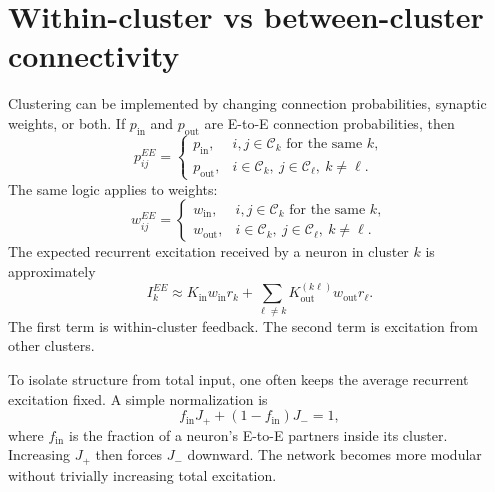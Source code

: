 \section{Within-cluster vs between-cluster connectivity}
\label{sec:within-vs-between-connectivity}

Clustering can be implemented by changing connection probabilities, synaptic weights, or both. If $p_{\mathrm{in}}$ and $p_{\mathrm{out}}$ are E-to-E connection probabilities, then
%
\begin{equation}
  p_{ij}^{EE}
  =
  \begin{cases}
    p_{\mathrm{in}}, & i,j\in\mathcal{C}_k \text{ for the same }k,\\
    p_{\mathrm{out}}, & i\in\mathcal{C}_k,\ j\in\mathcal{C}_{\ell},\ k\neq \ell .
  \end{cases}
  \label{eq:clustered-connection-probabilities}
\end{equation}
%
The same logic applies to weights:
%
\begin{equation}
  w_{ij}^{EE}
  =
  \begin{cases}
    w_{\mathrm{in}}, & i,j\in\mathcal{C}_k \text{ for the same }k,\\
    w_{\mathrm{out}}, & i\in\mathcal{C}_k,\ j\in\mathcal{C}_{\ell},\ k\neq \ell .
  \end{cases}
  \label{eq:clustered-weights-in-out}
\end{equation}
%
The expected recurrent excitation received by a neuron in cluster $k$ is approximately
%
\begin{equation}
  I_k^{EE}
  \approx
  K_{\mathrm{in}} w_{\mathrm{in}} r_k
  +
  \sum_{\ell\neq k} K_{\mathrm{out}}^{(k\ell)} w_{\mathrm{out}} r_{\ell}.
  \label{eq:expected-cluster-excitation}
\end{equation}
%
The first term is within-cluster feedback. The second term is excitation from other clusters.

To isolate structure from total input, one often keeps the average recurrent excitation fixed. A simple normalization is
%
\begin{equation}
  f_{\mathrm{in}}J_+
  +
  (1-f_{\mathrm{in}})J_-
  =
  1,
  \label{eq:cluster-strength-normalization-ch05}
\end{equation}
%
where $f_{\mathrm{in}}$ is the fraction of a neuron's E-to-E partners inside its cluster. Increasing $J_+$ then forces $J_-$ downward. The network becomes more modular without trivially increasing total excitation.

